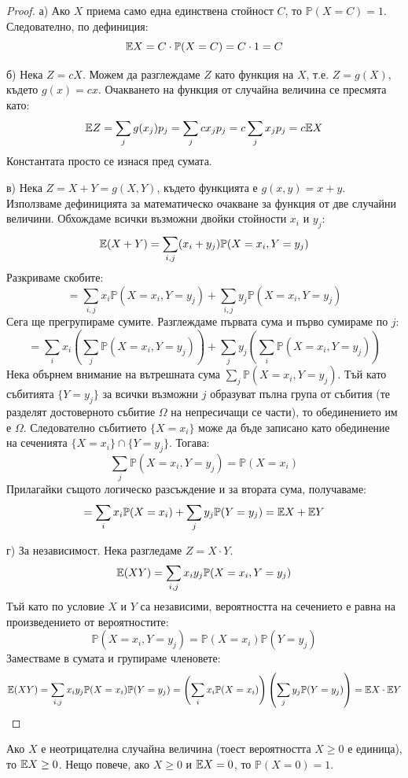 \begin{proof}
а) Ако $X$ приема само една единствена стойност $C$, то $\mathbb{P}(X=C) = 1$. Следователно, по дефиниция:
\[ \mathbb{E} X = C \cdot \mathbb{P}(X=C) = C \cdot 1 = C \]

б) Нека $Z = cX$. Можем да разглеждаме $Z$ като функция на $X$, т.е. $Z = g(X)$, където $g(x) = cx$. Очакването на функция от случайна величина се пресмята като:
\[ \mathbb{E} Z = \sum_{j} g(x_j) p_j = \sum_{j} c x_j p_j = c \sum_{j} x_j p_j = c\mathbb{E} X \]
Константата просто се изнася пред сумата.

в) Нека $Z = X + Y = g(X,Y)$, където функцията е $g(x,y) = x+y$. Използваме дефиницията за математическо очакване за функция от две случайни величини. Обхождаме всички възможни двойки стойности $x_i$ и $y_j$:
\[ \mathbb{E}(X+Y) = \sum_{i, j} (x_i + y_j) \mathbb{P}(X=x_i, Y=y_j) \]
Разкриваме скобите:
\[ = \sum_{i, j} x_i \mathbb{P}(X=x_i, Y=y_j) + \sum_{i, j} y_j \mathbb{P}(X=x_i, Y=y_j) \]
Сега ще прегрупираме сумите. Разглеждаме първата сума и първо сумираме по $j$:
\[ = \sum_{i} x_i \left( \sum_{j} \mathbb{P}(X=x_i, Y=y_j) \right) + \sum_{j} y_j \left( \sum_{i} \mathbb{P}(X=x_i, Y=y_j) \right) \]
Нека обърнем внимание на вътрешната сума $\sum_{j} \mathbb{P}(X=x_i, Y=y_j)$. Тъй като събитията $\{Y=y_j\}$ за всички възможни $j$ образуват пълна група от събития (те разделят достоверното събитие $\Omega$ на непресичащи се части), то обединението им е $\Omega$. Следователно събитието $\{X=x_i\}$ може да бъде записано като обединение на сеченията $\{X=x_i\} \cap \{Y=y_j\}$. Тогава:
\[ \sum_{j} \mathbb{P}(X=x_i, Y=y_j) = \mathbb{P}(X=x_i) \]
Прилагайки същото логическо разсъждение и за втората сума, получаваме:
\[ = \sum_{i} x_i \mathbb{P}(X=x_i) + \sum_{j} y_j \mathbb{P}(Y=y_j) = \mathbb{E} X + \mathbb{E} Y \]

г) За независимост. Нека разгледаме $Z = X \cdot Y$.
\[ \mathbb{E}(XY) = \sum_{i, j} x_i y_j \mathbb{P}(X=x_i, Y=y_j) \]
Тъй като по условие $X$ и $Y$ са независими, вероятността на сечението е равна на произведението от вероятностите:
\[ \mathbb{P}(X=x_i, Y=y_j) = \mathbb{P}(X=x_i) \mathbb{P}(Y=y_j) \]
Заместваме в сумата и групираме членовете:
\[ \mathbb{E}(XY) = \sum_{i, j} x_i y_j \mathbb{P}(X=x_i)\mathbb{P}(Y=y_j) = \left( \sum_{i} x_i \mathbb{P}(X=x_i) \right) \left( \sum_{j} y_j \mathbb{P}(Y=y_j) \right) = \mathbb{E} X \cdot \mathbb{E} Y \]

\end{proof}

\begin{prop}\label{prop:nonneg-exp}
Ако $X$ е неотрицателна случайна величина (тоест вероятността $X \ge 0$ е единица), то $\mathbb{E} X \ge 0$.
Нещо повече, ако $X \ge 0$ и $\mathbb{E} X = 0$, то $\mathbb{P}(X = 0) = 1$.
\end{prop}

